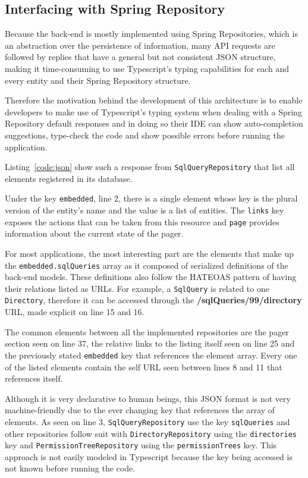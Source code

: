 \subsection{Interfacing with Spring Repository}\label{f:isr}
Because the back-end is mostly implemented using Spring Repositories, which is an abstraction over the persistence of information, many \gls{API} requests are followed by replies that have a general but not consistent \gls{JSON} structure, making it time-consuming to use Typescript's typing capabilities for each and every entity and their Spring Repository structure.

Therefore the motivation behind the development of this architecture is to enable developers to make use of Typescript's typing system when dealing with a Spring Repository default responses and in doing so their \gls{IDE} can show auto-completion suggestions, type-check the code and show possible errors before running the application.

Listing~\ref{code:json} show such a response from \texttt{SqlQueryRepository} that list all elements registered in its database.

Under the key \texttt{\textunderscore embedded}, line 2, there is a single element whose key is the plural version of the entity's name and the value is a list of entities. The \texttt{\textunderscore links} key exposes the actions that can be taken from this resource and \texttt{page} provides information about the current state of the pager.

For most applications, the most interesting part are the elements that make up the \texttt{\textunderscore embedded.sqlQueries} array as it composed of serialized definitions of the back-end models. These definitions also follow the \gls{HATEOAS} pattern of having their relations listed as \gls{URL}s. For example, a \texttt{SqlQuery} is related to one \texttt{Directory},  therefore it can be accessed through the \textbf{/sqlQueries/99/directory} \gls{URL}, made explicit on line 15 and 16.

The common elements between all the implemented repositories are the pager section seen on line 37, the relative links to the listing itself seen on line 25 and the previously stated \texttt{\textunderscore embedded} key that references the element array. Every one of the listed elements contain the self \gls{URL} seen between lines 8 and 11 that references itself.

Although it is very declarative to human beings, this \gls{JSON} format is not very machine-friendly due to the ever changing key that references the array of elements. As seen on line 3, \texttt{SqlQueryRepository} use the key \texttt{sqlQueries} and other repositories follow suit with \texttt{DirectoryRepository} using the \texttt{directories} key and \texttt{PermissionTreeRepository} using the \texttt{permissionTrees} key. This approach is not easily modeled in Typescript because the key being accessed is not known before running the code. 

